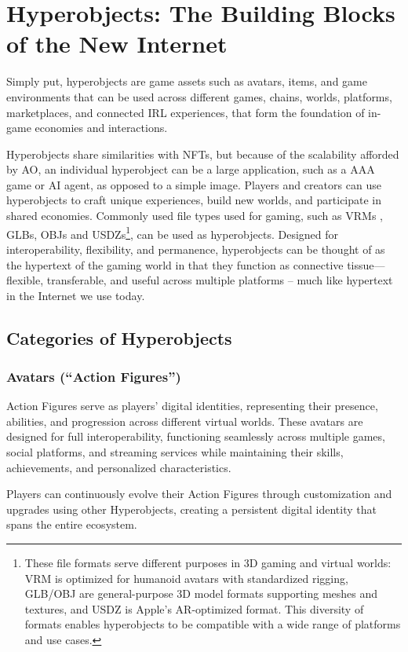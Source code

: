 \section{Hyperobjects: The Building Blocks of the New Internet}

Simply put, hyperobjects are game assets such as avatars, items, and game environments that can be used across different games, chains, worlds, platforms, marketplaces, and connected IRL experiences, that form the foundation of in-game economies and interactions.

Hyperobjects share similarities with NFTs, but because of the scalability afforded by AO, an individual hyperobject can be a large application, such as a AAA game or AI agent, as opposed to a simple image. Players and creators can use hyperobjects to craft unique experiences, build new worlds, and participate in shared economies. Commonly used file types used for gaming, such as VRMs \cite{VRM2024}, GLBs, OBJs and USDZs\footnote{These file formats serve different purposes in 3D gaming and virtual worlds: VRM is optimized for humanoid avatars with standardized rigging, GLB/OBJ are general-purpose 3D model formats supporting meshes and textures, and USDZ is Apple's AR-optimized format. This diversity of formats enables hyperobjects to be compatible with a wide range of platforms and use cases.}, can be used as hyperobjects. Designed for interoperability, flexibility, and permanence, hyperobjects can be thought of as the hypertext of the gaming world in that they function as connective tissue---flexible, transferable, and useful across multiple platforms -- much like hypertext in the Internet we use today.

\subsection{Categories of Hyperobjects}

\subsubsection{Avatars (``Action Figures'')}
Action Figures serve as players' digital identities, representing their presence, abilities, and progression across different virtual worlds. These avatars are designed for full interoperability, functioning seamlessly across multiple games, social platforms, and streaming services while maintaining their skills, achievements, and personalized characteristics. 

Players can continuously evolve their Action Figures through customization and upgrades using other Hyperobjects, creating a persistent digital identity that spans the entire ecosystem.

